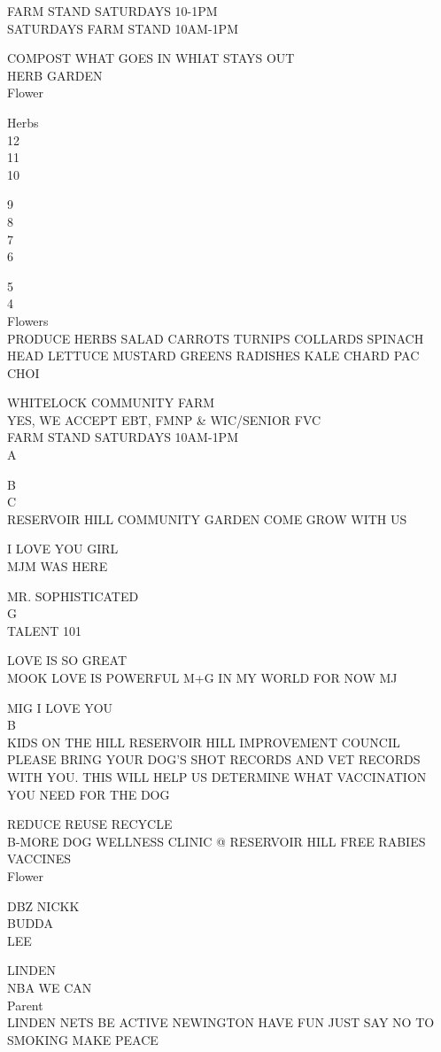 \documentclass[10pt,letterpaper]{article}
\begin{document}
FARM STAND SATURDAYS 10{-}1PM\\
SATURDAYS FARM STAND 10AM{-}1PM

COMPOST WHAT GOES IN WHIAT STAYS OUT\\
HERB GARDEN\\
Flower

Herbs\\
12\\
11\\
10

9\\
8\\
7\\
6

5\\
4\\
Flowers\\
PRODUCE HERBS SALAD CARROTS TURNIPS COLLARDS SPINACH HEAD LETTUCE MUSTARD GREENS RADISHES KALE CHARD PAC CHOI

WHITELOCK COMMUNITY FARM\\
YES, WE ACCEPT EBT, FMNP \& WIC/SENIOR FVC\\
FARM STAND SATURDAYS 10AM{-}1PM\\
A

B\\
C\\
RESERVOIR HILL COMMUNITY GARDEN COME GROW WITH US

I LOVE YOU GIRL\\
MJM WAS HERE

MR. SOPHISTICATED\\
G\\
TALENT 101

LOVE IS SO GREAT\\
MOOK LOVE IS POWERFUL M+G IN MY WORLD FOR NOW MJ

MIG I LOVE YOU\\
B\\
KIDS ON THE HILL RESERVOIR HILL IMPROVEMENT COUNCIL\\
PLEASE BRING YOUR DOG'S SHOT RECORDS AND VET RECORDS WITH YOU.  THIS WILL HELP US DETERMINE WHAT VACCINATION YOU NEED FOR THE DOG

REDUCE REUSE RECYCLE\\
B{-}MORE DOG WELLNESS CLINIC @ RESERVOIR HILL FREE RABIES VACCINES\\
Flower

DBZ NICKK\\
BUDDA\\
LEE

LINDEN\\
NBA WE CAN\\
Parent\\
LINDEN NETS BE ACTIVE NEWINGTON HAVE FUN JUST SAY NO TO SMOKING MAKE PEACE
\end{document}
